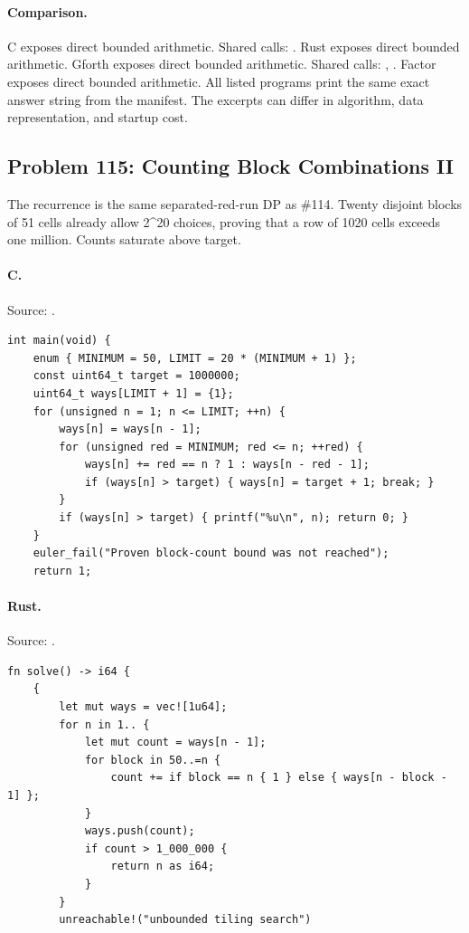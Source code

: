 \paragraph{Comparison.}
C exposes direct bounded arithmetic. Shared calls: \texttt{}. Rust exposes direct bounded arithmetic. Gforth exposes direct bounded arithmetic. Shared calls: \texttt{}, \texttt{}. Factor exposes direct bounded arithmetic.
All listed programs print the same exact answer string from the manifest. The excerpts can differ in algorithm, data representation, and startup cost.

\subsection{Problem 115: Counting Block Combinations II}
\label{walkthrough:p115}
The recurrence is the same separated-red-run DP as \#114. Twenty disjoint blocks of 51 cells already allow 2\textasciicircum{}20 choices, proving that a row of 1020 cells exceeds one million. Counts saturate above target.

\paragraph{C.} Source: .
\begin{lstlisting}
int main(void) {
    enum { MINIMUM = 50, LIMIT = 20 * (MINIMUM + 1) };
    const uint64_t target = 1000000;
    uint64_t ways[LIMIT + 1] = {1};
    for (unsigned n = 1; n <= LIMIT; ++n) {
        ways[n] = ways[n - 1];
        for (unsigned red = MINIMUM; red <= n; ++red) {
            ways[n] += red == n ? 1 : ways[n - red - 1];
            if (ways[n] > target) { ways[n] = target + 1; break; }
        }
        if (ways[n] > target) { printf("%u\n", n); return 0; }
    }
    euler_fail("Proven block-count bound was not reached");
    return 1;
\end{lstlisting}

\paragraph{Rust.} Source: .
\begin{lstlisting}
fn solve() -> i64 {
    {
        let mut ways = vec![1u64];
        for n in 1.. {
            let mut count = ways[n - 1];
            for block in 50..=n {
                count += if block == n { 1 } else { ways[n - block - 1] };
            }
            ways.push(count);
            if count > 1_000_000 {
                return n as i64;
            }
        }
        unreachable!("unbounded tiling search")
\end{lstlisting}

